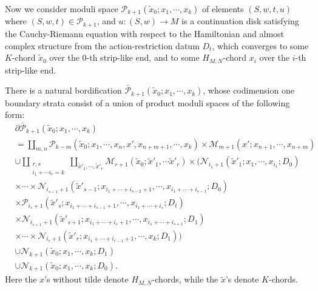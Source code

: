 \documentclass{amsart}
\numberwithin{equation}{section}
\numberwithin{figure}{section}
\begin{document}
	Now we consider moduli space $\mathcal{P}_{k+1}(\tilde{x}_{0}; x_{1}, \cdots, x_{k})$ of elements $(S, w, t, u)$ where $(S, w, t) \in \mathcal{P}_{k+1}$, and $u: (S, w) \to M$ is a continuation disk satisfying the Cauchy-Riemann equation with respect to the Hamiltonian and almost complex structure from the action-restriction datum $D_{t}$, which converges to some $K$-chord $\tilde{x}_{0}$ over the $0$-th strip-like end, and to some $H_{M, N}$-chord $x_{i}$ over the $i$-th strip-like end. \par
	There is a natural bordification $\bar{\mathcal{P}}_{k+1}(\tilde{x}_{0}; x_{1}, \cdots, x_{k})$, whose codimension one boundary strata consist of a union of product moduli spaces of the following form:
\begin{equation}\label{boundary strata of moduli space defining homotopy of action-restriction functors}
\begin{split}
&\partial \bar{\mathcal{P}}_{k+1}(\tilde{x}_{0}; x_{1}, \cdots, x_{k})\\
&= \coprod_{m, n} \mathcal{P}_{k-m}(\tilde{x}_{0}; x_{1}, \cdots, x_{n}, x', x_{n+m+1}, \cdots, x_{k}) \times \mathcal{M}_{m+1}(x'; x_{n+1}, \cdots, x_{n+m})\\
&\cup \coprod_{\substack{r, s\\i_{1} + \cdots i_{r} = k}} \coprod_{\tilde{x}'_{1}, \cdots, \tilde{x}'_{r}} \mathcal{M}_{r+1}(\tilde{x}_{0}; \tilde{x}'_{1}, \cdots \tilde{x}'_{r}) \times (\mathcal{N}_{i_{1}+1}(\tilde{x}'_{1}; x_{1}, \cdots, x_{i_{1}}; D_{0})\\
&\times \cdots \times \mathcal{N}_{i_{s-1}+1}(\tilde{x}'_{s-1}; x_{i_{1} + \cdots + i_{s-2} + 1}, \cdots, x_{i_{1} + \cdots + i_{s-1}}; D_{0})\\
&\times \mathcal{P}_{i_{s}+1}(\tilde{x}'_{s}; x_{i_{1} + \cdots + i_{s-1} + 1}, \cdots, x_{i_{1} + \cdots + i_{s}}; D_{t})\\
&\times \mathcal{N}_{i_{s+1}+1}(\tilde{x}'_{s+1}; x_{i_{1} + \cdots + i_{s} + 1}, \cdots, x_{i_{1} + \cdots + i_{s+1}}; D_{1})\\
&\times \cdots \times \mathcal{N}_{i_{r}+1}(\tilde{x}'_{r}; x_{i_{1} + \cdots + i_{r-1} + 1}, \cdots, x_{k}; D_{1}))\\
&\cup \mathcal{N}_{k+1}(\tilde{x}_{0}; x_{1}, \cdots, x_{k}; D_{1})\\
&\cup \mathcal{N}_{k+1}(\tilde{x}_{0}; x_{1}, \cdots, x_{k}; D_{0}).
\end{split}
\end{equation}
Here the $x$'s without tilde denote $H_{M, N}$-chords, while the $\tilde{x}$'s denote $K$-chords. \par
\end{document}
